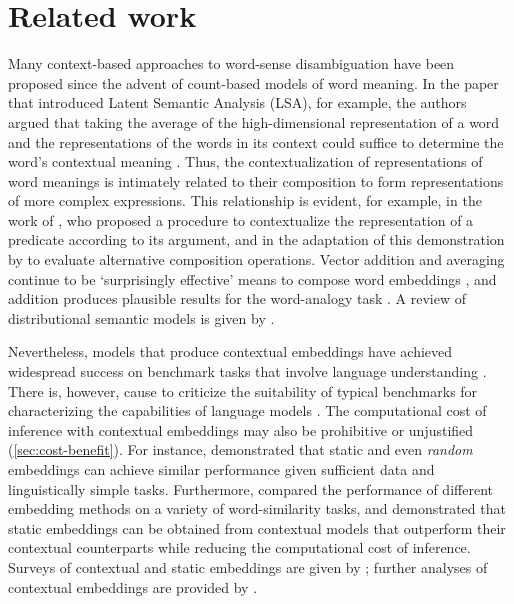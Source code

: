 \section{Related work}
\label{sec:related-work}

Many context-based approaches to word-sense disambiguation have been proposed since the
advent of count-based models of word meaning.
In the paper that introduced Latent Semantic Analysis (LSA), for example, the authors
argued that taking the average of the high-dimensional representation of a word and the
representations of the words in its context could suffice to determine the word's
contextual meaning \parencite[229-230]{Landauer1997}.
Thus, the contextualization of representations of word meanings is intimately related
to their composition to form representations of more complex expressions.
This relationship is evident, for example, in the work of \textcite{Kintsch2001}, who
proposed a procedure to contextualize the representation of a predicate according to
its argument, and in the adaptation of this demonstration by \textcite{Mitchell2008} to
evaluate alternative composition operations.
Vector addition and averaging continue to be `surprisingly effective' means to compose
word embeddings \parencite[10]{Boleda2020}, and addition produces plausible results for
the word-analogy task \parencites[e.g.,][9]{Mikolov2013}[7]{Mikolov2013a}.
A review of distributional semantic models is given by \textcite{Lenci2018}.

Nevertheless, models that produce contextual embeddings have achieved widespread
success on benchmark tasks that involve language understanding
\parencite[22-27]{Bommasani2022}.
There is, however, cause to criticize the suitability of typical benchmarks for
characterizing the capabilities of language models \parencite[5-6]{Srivastava2023}.
The computational cost of inference with contextual embeddings may also be prohibitive
or unjustified (\cref{sec:cost-benefit}).
For instance, \textcite{Arora2020} demonstrated that static and even \emph{random}
embeddings can achieve similar performance given sufficient data and linguistically
simple tasks.
Furthermore, \textcites[5244-5246]{Gupta2019}[4760-4762]{Bommasani2020} compared the
performance of different embedding methods on a variety of word-similarity tasks, and
demonstrated that static embeddings can be obtained from contextual models that
outperform their contextual counterparts while reducing the computational cost of
inference.
Surveys of contextual and static embeddings are given by
\textcites{Liu2020}{Torregrossa2021}; further analyses of contextual embeddings are
provided by \textcites{Hewitt2019}{Liu2019}{Reif2019}{Brunner2019}.

